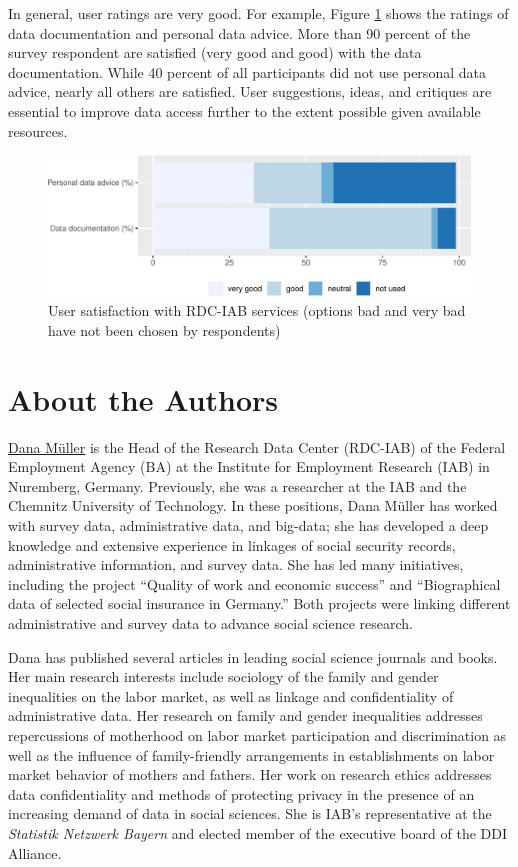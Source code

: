 In general, user ratings are very good. For example, Figure \ref{fig:iabfig4} shows the ratings of data documentation and personal data advice. More than 90 percent of the survey respondent are satisfied (very good and good) with the data documentation. While 40 percent of all participants did not use personal data advice, nearly all others are satisfied. User suggestions, ideas, and critiques are essential to improve data access further to the extent possible given available resources.

\begin{figure}
\centering
\includegraphics{figures/iabfig4-1.pdf}
\caption{\label{fig:iabfig4}User satisfaction with RDC-IAB services (options bad and very bad have not been chosen by respondents)}
\end{figure}

\hypertarget{about-the-authors-2}{%
\section*{About the Authors}\label{about-the-authors-2}}

\href{https://www.iab.de/en/ueberblick/mitarbeiter.aspx/Mitarbeiter/251}{Dana Müller} is the Head of the Research Data Center (RDC-IAB) of the Federal Employment Agency (BA) at the Institute for Employment Research (IAB) in Nuremberg, Germany. Previously, she was a researcher at the IAB and the Chemnitz University of Technology. In these positions, Dana Müller has worked with survey data, administrative data, and big-data; she has developed a deep knowledge and extensive experience in linkages of social security records, administrative information, and survey data. She has led many initiatives, including the project ``Quality of work and economic success'' and ``Biographical data of selected social insurance in Germany.'' Both projects were linking different administrative and survey data to advance social science research.

Dana has published several articles in leading social science journals and books. Her main research interests include sociology of the family and gender inequalities on the labor market, as well as linkage and confidentiality of administrative data. Her research on family and gender inequalities addresses repercussions of motherhood on labor market participation and discrimination as well as the influence of family-friendly arrangements in establishments on labor market behavior of mothers and fathers. Her work on research ethics addresses data confidentiality and methods of protecting privacy in the presence of an increasing demand of data in social sciences. She is IAB's representative at the \emph{Statistik Netzwerk Bayern} and elected member of the executive board of the DDI Alliance.

